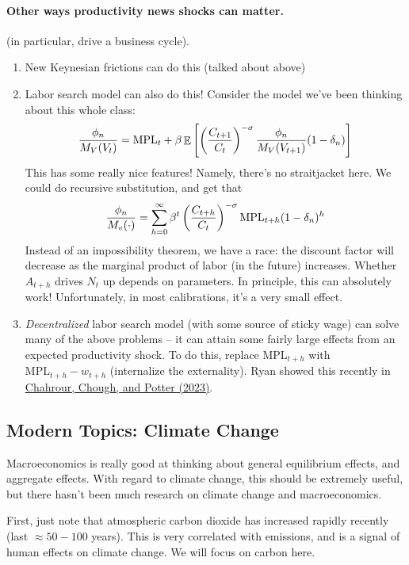 \documentclass[10pt]{article}
\begin{document}
\paragraph{Other ways productivity news shocks can matter.} (in particular, drive a business cycle).

\begin{enumerate}
	\item New Keynesian frictions can do this (talked about above)
	\item Labor search model can also do this! Consider the model we've been thinking about this whole class:
	\[
	\frac{\phi_n}{M_V(V_t)} = \text{MPL}_t + \beta \mathop{\mathbb{E}}\left[ \left( \frac{C_{t+1}}{C_t}\right)^{-\sigma} \frac{\phi_n}{M_V(V_{t+1})} (1 - \delta_n)\right]
	\]
	This has some really nice features! Namely, there's no straitjacket here. We could do recursive substitution, and get that
	\[
	\frac{\phi_n}{M_v(\cdot)} = \sum_{h=0}^\infty \beta^t  \left( \frac{C_{t+h}}{C_t}\right)^{-\sigma} \text{MPL}_{t+h} (1-\delta_n)^h
	\]
	Instead of an impossibility theorem, we have a race: the discount factor will decrease as the marginal product of labor (in the future) increases. Whether $A_{t+h}$ drives $N_t$ up depends on parameters. In principle, this can absolutely work! Unfortunately, in most calibrations, it's a very small effect.
	\item \emph{Decentralized} labor search model (with some source of sticky wage) can solve many of the above problems -- it can attain some fairly large effects from an expected productivity shock. To do this, replace $\text{MPL}_{t+h}$ with $\text{MPL}_{t+h} - w_{t+h}$ (\ie internalize the externality). Ryan showed this recently in \href{https://onlinelibrary.wiley.com/doi/full/10.3982/QE2029}{Chahrour, Chough, and Potter (2023)}.
\end{enumerate}

\subsection{Modern Topics: Climate Change}

\begin{remark}
	Macroeconomics is really good at thinking about general equilibrium effects, and aggregate effects. With regard to climate change, this should be extremely useful, but there hasn't been much research on climate change and macroeconomics.
\end{remark}

First, just note that atmospheric carbon dioxide has increased rapidly recently (last $\approx50-100$ years). This is very correlated with emissions, and is a signal of human effects on climate change. We will focus on carbon here.
\end{document}
